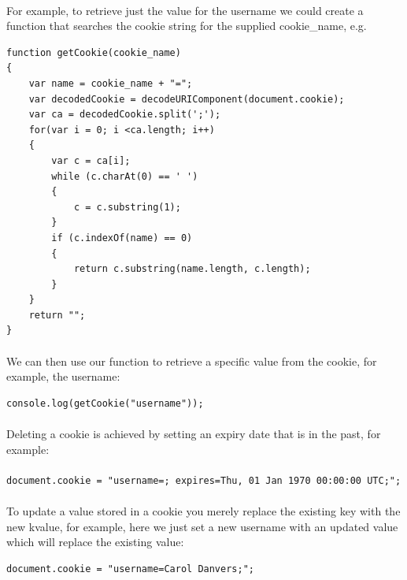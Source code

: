 \documentclass[10pt, a4paper, twosize]{article}
\begin{document}
\paragraph{} For example, to retrieve just the value for the username we could create a function that searches the cookie string for the supplied cookie\_name, e.g.
\begin{lstlisting}
function getCookie(cookie_name)
{
    var name = cookie_name + "=";
    var decodedCookie = decodeURIComponent(document.cookie);
    var ca = decodedCookie.split(';');
    for(var i = 0; i <ca.length; i++)
    {
        var c = ca[i];
        while (c.charAt(0) == ' ') 
        {
            c = c.substring(1);
        }
        if (c.indexOf(name) == 0) 
        {
            return c.substring(name.length, c.length);
        }
    }
    return "";
}
\end{lstlisting}

\paragraph{} We can then use our function to retrieve a specific value from the cookie, for example, the username:

\begin{lstlisting}
console.log(getCookie("username"));
\end{lstlisting}

\paragraph{} Deleting a cookie is achieved by setting an expiry date that is in the past, for example:
\paragraph{} 
\begin{lstlisting}
document.cookie = "username=; expires=Thu, 01 Jan 1970 00:00:00 UTC;";
\end{lstlisting}
\paragraph{}

\paragraph{} To update a value stored in a cookie you merely replace the existing key with the new kvalue, for example, here we just set a new username with an updated value which will replace the existing value:
\begin{lstlisting}
document.cookie = "username=Carol Danvers;";
\end{lstlisting}
\end{document}
